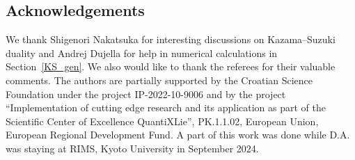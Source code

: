\documentclass[pdftex]{sigma}
\numberwithin{equation}{section}
\begin{document}
 \subsection*{Acknowledgements}
We thank Shigenori Nakatsuka for interesting discussions on Kazama--Suzuki duality and Andrej Dujella for help in numerical calculations in Section~\ref{KS_gen}. We also would like to thank the referees for their valuable comments.
The authors are partially supported by the Croatian Science Foundation under the project IP-2022-10-9006
 and by the project ``Implementation of cutting edge research and its application as part of the Scientific Center of Excellence QuantiXLie'', PK.1.1.02, European Union, European Regional Development Fund. A part of this work was done while D.A. was staying at RIMS, Kyoto University in September 2024.
\end{document}
